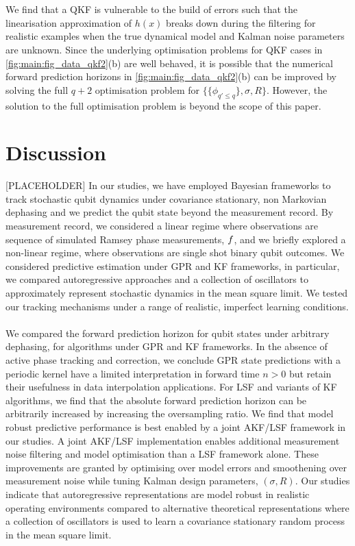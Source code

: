 \\
\\
We find that a QKF is vulnerable to the build of errors such that the linearisation approximation of $h(x)$ breaks down during the filtering for realistic examples when the true dynamical model and Kalman noise parameters are unknown. Since the underlying optimisation problems for QKF cases in \cref{fig:main:fig_data_qkf2}(b) are well behaved, it is possible that the numerical forward prediction horizons in \cref{fig:main:fig_data_qkf2}(b) can be improved by solving the full $q+2$ optimisation problem for $\{\{ \phi_{q' \leq q}\}, \sigma, R\}$. However, the solution to the full optimisation problem is beyond the scope of this paper.    


\section{Discussion}
[PLACEHOLDER]
In our studies, we have employed Bayesian frameworks to track stochastic qubit dynamics under covariance stationary, non Markovian dephasing and we predict the qubit state beyond the measurement record. By measurement record, we considered a linear regime where observations are sequence of simulated Ramsey phase measurements, $f$, and we briefly explored a non-linear regime, where observations are single shot binary qubit outcomes. We considered predictive estimation under GPR and KF frameworks, in particular, we compared autoregressive approaches and a collection of oscillators to approximately represent stochastic dynamics in the mean square limit. We tested our tracking mechanisms under a range of realistic, imperfect learning conditions. 
\\
\\
We compared the forward prediction horizon for qubit states under arbitrary dephasing, for algorithms under GPR and KF frameworks. In the absence of active phase tracking and correction, we conclude GPR state predictions  with a periodic kernel have a limited interpretation in forward time $n>0$ but retain their usefulness in data interpolation applications. For LSF and variants of KF algorithms, we find that the absolute forward prediction horizon can be arbitrarily increased by increasing the oversampling ratio.
We find that model robust predictive performance is best enabled by a joint AKF/LSF framework in our studies. A joint AKF/LSF implementation enables additional measurement noise filtering and model optimisation than a LSF framework alone. These improvements are granted by optimising over model errors and smoothening over measurement noise while tuning Kalman design parameters, $(\sigma, R)$. Our studies indicate that autoregressive representations are model robust in realistic operating environments compared to alternative theoretical representations where a collection of oscillators is used to learn a covariance stationary random process in the mean square limit. 
